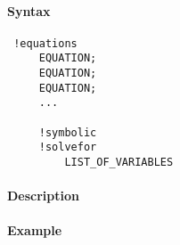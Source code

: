 


	\paragraph{Syntax}
 
 \begin{verbatim}
 !equations
     EQUATION;
     EQUATION;
     EQUATION;
     ...
 
     !symbolic
     !solvefor
         LIST_OF_VARIABLES
 \end{verbatim}
 
 \paragraph{Description}
 
 \paragraph{Example}


